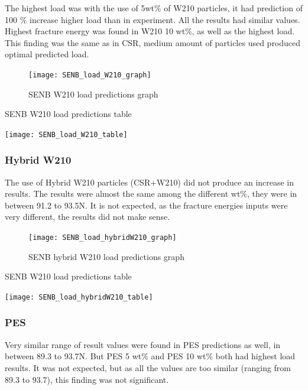 \documentclass[numbers=noendperiod,chapterprefix=on]{icldt} %
\begin{document}
{ The highest load was with the use of 5wt\% of W210 particles, it had prediction of 100 \% increase higher load than in experiment. All the results had similar values. Highest fracture energy was found in W210 10 wt\%, as well as the highest load. This finding was the same as in CSR, medium amount of particles used produced optimal predicted load.
 
 \begin{figure}[!hp]
  \centering
  \texttt{[image: SENB\_load\_W210\_graph]}\label{SENB_load_W210_graph}
  \caption{SENB W210 load predictions graph}
  \end{figure}
  \FloatBarrier
 
 \begin{table}
   \centering
   \caption{SENB W210 load predictions table}\label{SENB_load_W210_table}
   \texttt{[image: SENB\_load\_W210\_table]}
   \end{table}
   \FloatBarrier
   
\subsubsection{Hybrid W210}
The use of Hybrid W210 particles (CSR+W210) did not produce an increase in results. The results were almost the same among the different wt\%, they were in between 91.2 to 93.5N. It is not expected, as the fracture energies inputs were very different, the results did not make sense.

\begin{figure}[!hp]
  \centering
  \texttt{[image: SENB\_load\_hybridW210\_graph]}\label{SENB_load_hybridW210_graph}
  \caption{SENB hybrid W210 load predictions graph}
  \end{figure}
  \FloatBarrier
 
 \begin{table}
   \centering
   \caption{SENB W210 load predictions table}\label{SENB_load_hybridW210_table}
   \texttt{[image: SENB\_load\_hybridW210\_table]}
   \end{table}
   \FloatBarrier
   
\subsubsection{PES}   
Very similar range of result values were found in PES predictions as well, in between 89.3 to 93.7N. But PES 5 wt\% and PES 10 wt\% both had highest load results. It was not expected, but as all the values are too similar (ranging from 89.3 to 93.7), this finding was not significant.

}
\end{document}
